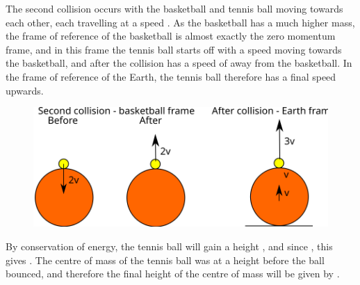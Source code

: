 \begin{problem}[Superball]
{The second collision occurs with the basketball and tennis ball moving towards each other, each travelling at a speed . As the basketball has a much higher mass, the frame of reference of the basketball is almost exactly the zero momentum frame, and in this frame the tennis ball starts off with a speed  moving towards the basketball, and after the collision has a speed of  away from the basketball. In the frame of reference of the Earth, the tennis ball therefore has a final speed  upwards.

\begin{figure}[h]
\centering
\includegraphics[width=1.0\textwidth]{../../../figures/dynamics_tennis_basket_ball_second.svg}
\caption{}\label{fig:dynamics_tennis_basket_second}
\end{figure}


By conservation of energy, the tennis ball will gain a height , and since , this gives . The centre of mass of the tennis ball was at a height  before the ball bounced, and therefore the final height of the centre of mass will be given by .

}
\end{problem}